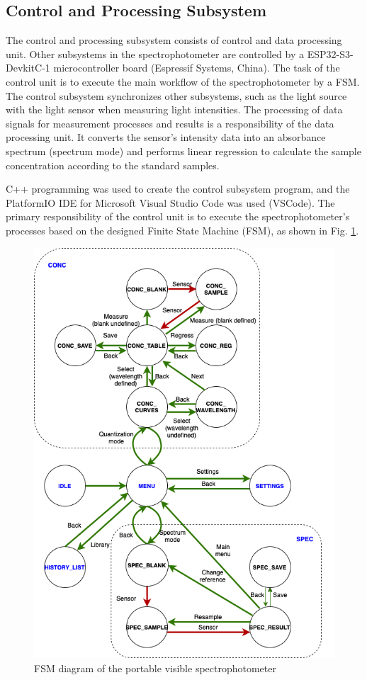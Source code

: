 \documentclass[conference]{IEEEtran}
\begin{document}
\subsection{Control and Processing Subsystem}
The control and processing subsystem consists of control and data processing unit.
Other subsystems in the spectrophotometer are controlled by a ESP32-S3-DevkitC-1 microcontroller board (Espressif Systems, China).
The task of the control unit is to execute the main workflow of the spectrophotometer by a FSM.
The control subsystem synchronizes other subsystems, such as the light source with the light sensor when measuring light intensities.
The processing of data signals for measurement processes and results is a responsibility of the data processing unit.
It converts the sensor's intensity data into an absorbance spectrum (spectrum mode) and performs linear regression to calculate the sample concentration according to the standard samples.

C++ programming was used to create the control subsystem program, and the PlatformIO IDE for Microsoft Visual Studio Code was used (VSCode).
The primary responsibility of the control unit is to execute the spectrophotometer's processes based on the designed Finite State Machine (FSM), as shown in Fig. \ref{fsm}.

    \begin{figure}[htbp]
    \centerline{\includegraphics[scale=0.35]{fsm.png}}
    \caption{FSM diagram of the portable visible spectrophotometer}
    \label{fsm}
    \end{figure}
\end{document}

